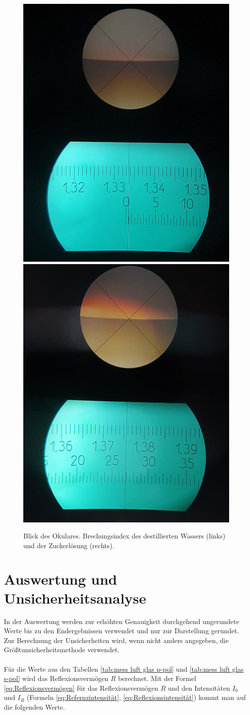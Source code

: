 \documentclass[12pt,a4paper,twoside]{article}
\begin{document}
\begin{figure}[H]
    \centering
    \includegraphics[width=0.4\linewidth]{nudes/wasser okular.jpg}
    \includegraphics[width=0.4\linewidth]{nudes/zucker okular.jpg}
    \caption{Blick des Okulares. Brechungsindex des destillierten Wassers (links) und der Zuckerlösung (rechts). }
    \label{fig:zucker wasser}
\end{figure}

\section{Auswertung und Unsicherheitsanalyse} %
In der Auswertung werden zur erhöhten Genauigkeit durchgehend ungerundete Werte bis zu den Endergebnissen verwendet und nur zur Darstellung gerundet. \\
Zur Berechnung der Unsicherheiten wird, wenn nicht anders angegeben, die Größtunsicherheitsmethode verwendet.
\\
\\
Für die Werte aus den Tabellen \ref{tab:mess luft glas p-pol} und \ref{tab:mess luft glas s-pol} wird das Reflexionsvermögen $R$ berechnet. 
Mit der Formel \ref{eq:Reflexionsvermögen} für das Reflexionsvermögen $R$ und den Intensitäten $I_0$ und $I_R$ (Formeln \ref{eq:Refernzintensität}, \ref{eq:Reflexionsintensität}) kommt man auf die folgenden Werte. 
\end{document}
